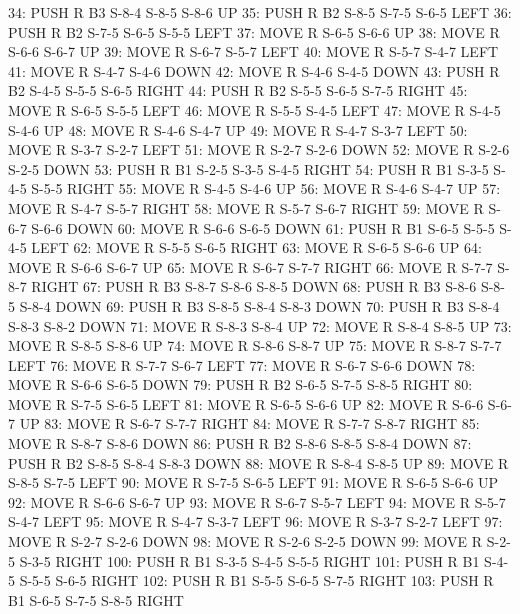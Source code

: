 \documentclass[12pt]{article}
\begin{document}
\begin{appendix}
\begin{itemize}
       34: PUSH R B3 S-8-4 S-8-5 S-8-6 UP
       35: PUSH R B2 S-8-5 S-7-5 S-6-5 LEFT
       36: PUSH R B2 S-7-5 S-6-5 S-5-5 LEFT
       37: MOVE R S-6-5 S-6-6 UP
       38: MOVE R S-6-6 S-6-7 UP
       39: MOVE R S-6-7 S-5-7 LEFT
       40: MOVE R S-5-7 S-4-7 LEFT
       41: MOVE R S-4-7 S-4-6 DOWN
       42: MOVE R S-4-6 S-4-5 DOWN
       43: PUSH R B2 S-4-5 S-5-5 S-6-5 RIGHT
       44: PUSH R B2 S-5-5 S-6-5 S-7-5 RIGHT
       45: MOVE R S-6-5 S-5-5 LEFT
       46: MOVE R S-5-5 S-4-5 LEFT
       47: MOVE R S-4-5 S-4-6 UP
       48: MOVE R S-4-6 S-4-7 UP
       49: MOVE R S-4-7 S-3-7 LEFT
       50: MOVE R S-3-7 S-2-7 LEFT
       51: MOVE R S-2-7 S-2-6 DOWN
       52: MOVE R S-2-6 S-2-5 DOWN
       53: PUSH R B1 S-2-5 S-3-5 S-4-5 RIGHT
       54: PUSH R B1 S-3-5 S-4-5 S-5-5 RIGHT
       55: MOVE R S-4-5 S-4-6 UP
       56: MOVE R S-4-6 S-4-7 UP
       57: MOVE R S-4-7 S-5-7 RIGHT
       58: MOVE R S-5-7 S-6-7 RIGHT
       59: MOVE R S-6-7 S-6-6 DOWN
       60: MOVE R S-6-6 S-6-5 DOWN
       61: PUSH R B1 S-6-5 S-5-5 S-4-5 LEFT
       62: MOVE R S-5-5 S-6-5 RIGHT
       63: MOVE R S-6-5 S-6-6 UP
       64: MOVE R S-6-6 S-6-7 UP
       65: MOVE R S-6-7 S-7-7 RIGHT
       66: MOVE R S-7-7 S-8-7 RIGHT
       67: PUSH R B3 S-8-7 S-8-6 S-8-5 DOWN
       68: PUSH R B3 S-8-6 S-8-5 S-8-4 DOWN
       69: PUSH R B3 S-8-5 S-8-4 S-8-3 DOWN
       70: PUSH R B3 S-8-4 S-8-3 S-8-2 DOWN
       71: MOVE R S-8-3 S-8-4 UP
       72: MOVE R S-8-4 S-8-5 UP
       73: MOVE R S-8-5 S-8-6 UP
       74: MOVE R S-8-6 S-8-7 UP
       75: MOVE R S-8-7 S-7-7 LEFT
       76: MOVE R S-7-7 S-6-7 LEFT
       77: MOVE R S-6-7 S-6-6 DOWN
       78: MOVE R S-6-6 S-6-5 DOWN
       79: PUSH R B2 S-6-5 S-7-5 S-8-5 RIGHT
       80: MOVE R S-7-5 S-6-5 LEFT
       81: MOVE R S-6-5 S-6-6 UP
       82: MOVE R S-6-6 S-6-7 UP
       83: MOVE R S-6-7 S-7-7 RIGHT
       84: MOVE R S-7-7 S-8-7 RIGHT
       85: MOVE R S-8-7 S-8-6 DOWN
       86: PUSH R B2 S-8-6 S-8-5 S-8-4 DOWN
       87: PUSH R B2 S-8-5 S-8-4 S-8-3 DOWN
       88: MOVE R S-8-4 S-8-5 UP
       89: MOVE R S-8-5 S-7-5 LEFT
       90: MOVE R S-7-5 S-6-5 LEFT
       91: MOVE R S-6-5 S-6-6 UP
       92: MOVE R S-6-6 S-6-7 UP
       93: MOVE R S-6-7 S-5-7 LEFT
       94: MOVE R S-5-7 S-4-7 LEFT
       95: MOVE R S-4-7 S-3-7 LEFT
       96: MOVE R S-3-7 S-2-7 LEFT
       97: MOVE R S-2-7 S-2-6 DOWN
       98: MOVE R S-2-6 S-2-5 DOWN
       99: MOVE R S-2-5 S-3-5 RIGHT
      100: PUSH R B1 S-3-5 S-4-5 S-5-5 RIGHT
      101: PUSH R B1 S-4-5 S-5-5 S-6-5 RIGHT
      102: PUSH R B1 S-5-5 S-6-5 S-7-5 RIGHT
      103: PUSH R B1 S-6-5 S-7-5 S-8-5 RIGHT

\end{itemize}
\end{appendix}
\end{document}
